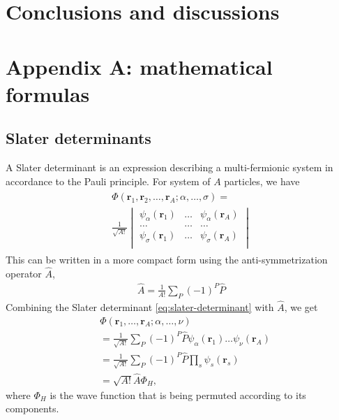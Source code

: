 \documentclass[11pt]{article}
\begin{document}
\section{Conclusions and discussions}



\section{Appendix A: mathematical formulas}
\subsection{Slater determinants}
A Slater determinant is an expression describing a multi-fermionic system in accordance to the Pauli principle. For system of $A$ particles, we have 
\begin{align}
	\begin{split}
		\Phi(\mathbf{r}_1,\mathbf{r}_2,\dots,\mathbf{r}_A; \alpha,\dots,\sigma) =\\
		\frac{1}{\sqrt{A!}}
		\begin{vmatrix}
			\psi_\alpha(\mathbf{r}_1) & \dots & \psi_\alpha(\mathbf{r}_A) \\
			\dots & \dots & \dots \\
			\psi_\sigma(\mathbf{r}_1) & \dots & \psi_\sigma(\mathbf{r}_A) \\
		\end{vmatrix}
	\end{split}
	\label{eq:slater-determinant}
\end{align}
This can be written in a more compact form using the anti-symmetrization operator $\hat{A}$,
\begin{align}
	\hat{A} = \frac{1}{A!}\sum_P (-1)^P \hat{P}
	\label{eq:anti-symmetrization-operator}
\end{align}
Combining the Slater determinant \eqref{eq:slater-determinant} with $\hat{A}$, we get
\begin{align}
	&\Phi(\mathbf{r}_1,\dots,\mathbf{r}_A;\alpha,\dots,\nu) \nonumber \\
	&= \frac{1}{\sqrt{A!}}\sum_P (-1)^P \hat{P}\psi_\alpha(\mathbf{r}_1)\dots\psi_\nu(\mathbf{r}_A) \nonumber \\
	&= \frac{1}{\sqrt{A!}}\sum_P (-1)^P \hat{P} \prod_s \psi_s(\mathbf{r}_s) \nonumber \\
	&= \sqrt{A!}\hat{A}\Phi_H,
	\label{eq:slater-determinant-compact}
\end{align}
where $\Phi_H$ is the wave function that is being permuted according to its components.
\end{document}
